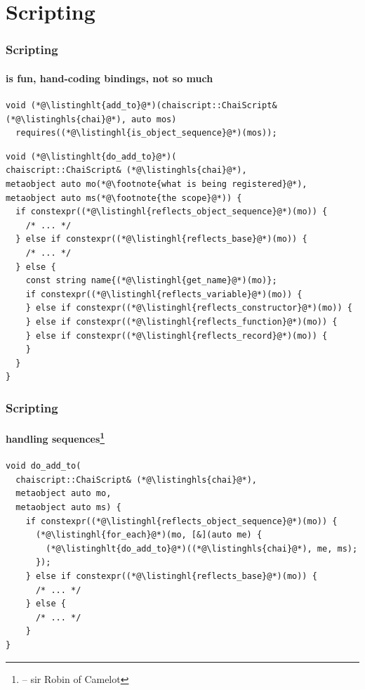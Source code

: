 \documentclass[aspectratio=169,compress,table,xcolor=table]{beamer}
\begin{document}
\section{Scripting}
\begin{frame}[fragile]
  \frametitle{Scripting}
  \framesubtitle{is fun, hand-coding bindings, not so much}
  \begin{lstlisting}[language=c++2x,basicstyle=\footnotesize\ttfamily]
void (*@\listinghlt{add_to}@*)(chaiscript::ChaiScript& (*@\listinghls{chai}@*), auto mos)
  requires((*@\listinghl{is_object_sequence}@*)(mos));
  \end{lstlisting}
  \begin{lstlisting}[language=c++2x,basicstyle=\scriptsize\ttfamily]
void (*@\listinghlt{do_add_to}@*)(
chaiscript::ChaiScript& (*@\listinghls{chai}@*),
metaobject auto mo(*@\footnote{what is being registered}@*),
metaobject auto ms(*@\footnote{the scope}@*)) {
  if constexpr((*@\listinghl{reflects_object_sequence}@*)(mo)) {
    /* ... */
  } else if constexpr((*@\listinghl{reflects_base}@*)(mo)) {
    /* ... */
  } else {
    const string name{(*@\listinghl{get_name}@*)(mo)};
    if constexpr((*@\listinghl{reflects_variable}@*)(mo)) {
    } else if constexpr((*@\listinghl{reflects_constructor}@*)(mo)) {
    } else if constexpr((*@\listinghl{reflects_function}@*)(mo)) {
    } else if constexpr((*@\listinghl{reflects_record}@*)(mo)) {
    }
  }
}
  \end{lstlisting}
\end{frame}
\begin{frame}[fragile]
  \frametitle{Scripting}
  \framesubtitle{handling sequences\footnote{ -- sir Robin of Camelot}}
  \begin{lstlisting}[language=c++2x,basicstyle=\small\ttfamily]
void do_add_to(
  chaiscript::ChaiScript& (*@\listinghls{chai}@*),
  metaobject auto mo,
  metaobject auto ms) {
    if constexpr((*@\listinghl{reflects_object_sequence}@*)(mo)) {
      (*@\listinghl{for_each}@*)(mo, [&](auto me) {
        (*@\listinghlt{do_add_to}@*)((*@\listinghls{chai}@*), me, ms);
      });
    } else if constexpr((*@\listinghl{reflects_base}@*)(mo)) {
      /* ... */
    } else {
      /* ... */
    }
}
  \end{lstlisting}
\end{frame}
\end{document}
